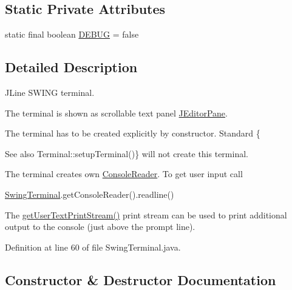 \subsection*{Static Private Attributes}
\begin{DoxyCompactItemize}
\item 
static final boolean \hyperlink{classgov_1_1nasa_1_1jpf_1_1inspector_1_1frontends_1_1jpfshell_1_1gui_1_1_swing_terminal_a17f1bfb7c9ffd860344e7c9ee087d041}{D\+E\+B\+UG} = false
\end{DoxyCompactItemize}


\subsection{Detailed Description}
J\+Line S\+W\+I\+NG terminal. 

The terminal is shown as scrollable text panel \hyperlink{}{J\+Editor\+Pane}.

The terminal has to be created explicitly by constructor. Standard \{\begin{DoxySeeAlso}{See also}
Terminal\+::setup\+Terminal()\} will not create this terminal.
\end{DoxySeeAlso}
The terminal creates own \hyperlink{}{Console\+Reader}. To get user input call
\begin{DoxyCode}
\hyperlink{classgov_1_1nasa_1_1jpf_1_1inspector_1_1frontends_1_1jpfshell_1_1gui_1_1_swing_terminal_aefef2b68870e85e79ff719fd0093aad4}{SwingTerminal}.getConsoleReader().readline() 
\end{DoxyCode}


The \hyperlink{classgov_1_1nasa_1_1jpf_1_1inspector_1_1frontends_1_1jpfshell_1_1gui_1_1_swing_terminal_a5cec7ed0d51341b8ff2c65090c7f7a14}{get\+User\+Text\+Print\+Stream()} print stream can be used to print additional output to the console (just above the prompt line). 

Definition at line 60 of file Swing\+Terminal.\+java.



\subsection{Constructor \& Destructor Documentation}
